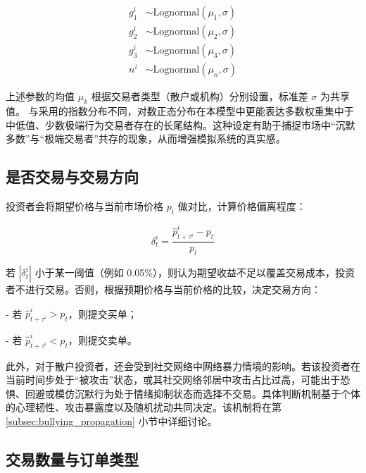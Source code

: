 \begin{equation}
    \begin{aligned}
    g_1^i &\sim \text{Lognormal}(\mu_1, \sigma) \\
    g_2^i &\sim \text{Lognormal}(\mu_2, \sigma) \\
    g_3^i &\sim \text{Lognormal}(\mu_3, \sigma) \\
    n^i   &\sim \text{Lognormal}(\mu_{n}, \sigma)
    \end{aligned}
\end{equation}
    

上述参数的均值 \(\mu_k\) 根据交易者类型（散户或机构）分别设置，标准差 \(\sigma\) 为共享值。
与\textcite{chiarella2009impact}采用的指数分布不同，对数正态分布在本模型中更能表达多数权重集中于中低值、少数极端行为交易者存在的长尾结构。这种设定有助于捕捉市场中“沉默多数”与“极端交易者”共存的现象，从而增强模拟系统的真实感。




\subsection{是否交易与交易方向}
\label{subsec:trade direction}

投资者会将期望价格与当前市场价格 \( p_t \) 做对比，计算价格偏离程度：

\begin{equation}
    \delta_t^i = \frac{\widehat{p}_{t+\tau^i}^i - p_t}{p_t}
\end{equation}

若 \(|\delta_t^i|\) 小于某一阈值（例如 0.05\%），则认为期望收益不足以覆盖交易成本，投资者不进行交易。否则，根据预期价格与当前价格的比较，决定交易方向：

- 若 \(\widehat{p}_{t+\tau^i}^i > p_t\)，则提交买单；

- 若 \(\widehat{p}_{t+\tau^i}^i < p_t\)，则提交卖单。

此外，对于散户投资者，还会受到社交网络中网络暴力情境的影响。若该投资者在当前时间步处于“被攻击”状态，或其社交网络邻居中攻击占比过高，可能出于恐惧、回避或模仿沉默行为处于情绪抑制状态而选择不交易。具体判断机制基于个体的心理韧性、攻击暴露度以及随机扰动共同决定。该机制将在第 \ref{subsec:bullying_propagation} 小节中详细讨论。

\subsection{交易数量与订单类型}
\label{subsec:trade qty and order type}

